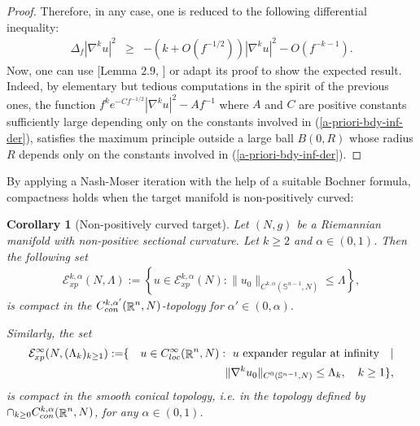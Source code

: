 \documentclass[a4paper,11pt,reqno]{amsart}
\newtheorem{coro}[defn]{Corollary}
\newtheorem{rk}[defn]{Remark}
\def\R{\mathop{\rm \mathbb{R}}\nolimits}
\newcommand{\Ent}{\mathcal{E}}
\begin{document}
\begin{proof}
 Therefore, in any case, one is reduced to the following differential inequality:
\begin{eqnarray*}
\Delta_f|\nabla^ku|^2&\geq&-\left(k+\textit{O}\left(f^{-1/2}\right)\right)|\nabla^ku|^2-\textit{O}\left(f^{-k-1}\right).
\end{eqnarray*}
Now, one can use [Lemma $2.9$, \cite{Der-Asy-Com-Egs}] or adapt its proof to show the expected result.
Indeed, by elementary but tedious computations in the spirit of the previous ones, the function $f^{k}e^{-Cf^{-1/2}}|\nabla^k u|^2-Af^{-1}$ where $A$ and $C$ are positive constants sufficiently large depending only on the constants involved in (\ref{a-priori-bdy-inf-der}), satisfies the maximum principle outside a large ball $B(0,R)$ whose radius $R$ depends only on the constants involved in (\ref{a-priori-bdy-inf-der}). 

\end{proof}

By applying a Nash-Moser iteration with the help of a suitable Bochner formula, compactness holds when the target manifold is non-positively curved:
\begin{coro}[Non-positively curved target]\label{coro-non-neg-tar-comp}
Let $(N,g)$ be a Riemannian manifold with non-positive sectional curvature. Let $k\geq 2$ and $\alpha\in(0,1)$. Then the following set
\begin{eqnarray*}
\mathcal{E}_{xp}^{k,\alpha}(N,\Lambda):=\left\{u\in \Ent_{xp}^{k,\alpha}( N):   \|u_0\|_{C^{k,\alpha}(\mathbb{S}^{n-1},N)}\leq \Lambda \right\},
\end{eqnarray*}
is compact in the $C_{con}^{k,\alpha'}(\R^n,N)$-topology for $\alpha'\in(0,\alpha).$

Similarly, the set
\begin{eqnarray*}
\mathcal{E}_{xp}^{\infty}(N,(\Lambda_k)_{k\geq 1}):=&\{&u\in C^{\infty}_{loc}(\R^n, N): \text{ $u$ expander regular at infinity}\quad|\\
&& \quad  \|\nabla^k u_0\|_{C^0(\mathbb{S}^{n-1},N)}\leq \Lambda_k,\quad k\geq 1 \},
\end{eqnarray*}
is compact in the smooth conical topology, i.e. in the topology defined by $\cap_{k\geq 0}C^{k,\alpha}_{con}(\R^n,N)$, for any $\alpha\in(0,1)$.

\end{coro}
\end{document}
